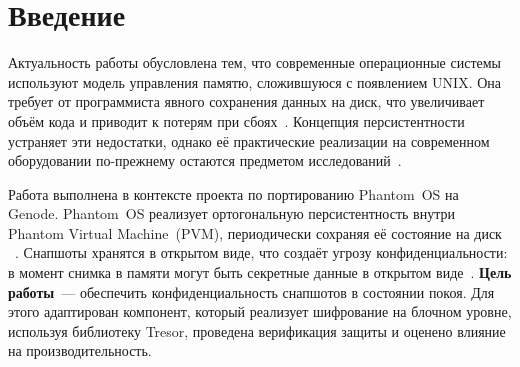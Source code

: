 \chapter{Введение}

Актуальность работы обусловлена тем, что современные операционные системы используют модель управления памятю, сложившуюся с появлением UNIX. Она требует от программиста явного сохранения данных на диск, что увеличивает объём кода и приводит к потерям при сбоях~\cite{PLA}. Концепция персистентности устраняет эти недостатки, однако её практические реализации на современном оборудовании по-прежнему остаются предметом исследований~\cite{Revisited,Aurora}.

Работа выполнена в контексте проекта по портированию Phantom~OS на Genode. Phantom~OS реализует ортогональную персистентность внутри Phantom Virtual Machine~(PVM), периодически сохраняя её состояние на диск ~\cite{Phantom_docs}. Снапшоты хранятся в открытом виде, что создаёт угрозу конфиденциальности: в момент снимка в памяти могут быть секретные данные в открытом виде~\cite{SNIA_PM_Security,VM_Security}. \textbf{Цель работы}~--- обеспечить конфиденциальность снапшотов в состоянии покоя. Для этого адаптирован компонент, который реализует шифрование на блочном уровне, используя библиотеку Tresor, проведена верификация защиты и оценено влияние на производительность.
